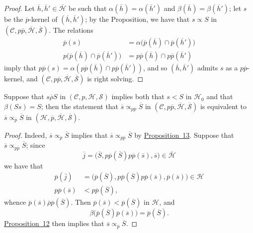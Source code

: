 \documentclass[a4paper,fleqn]{article}
\theoremstyle{plain}
\newenvironment{corollary}[1]
  {\renewcommand\theinnercorollary{#1}\innercorollary}
  {\endinnercorollary}
\theoremstyle{definition}
\newcommand{\oldpage}[1]{{\marginpar{\footnotesize$\bigg\vert$\,\,\,\,\textit{p.~#1}}}}
\newcommand{\CC}{\mathcal{C}}
\newcommand{\HH}{\mathcal{H}}
\newcommand{\bHH}{\overline{\HH}}
\renewcommand{\SS}{\mathcal{S}}
\newcommand{\bSS}{\overline{\SS}}
\newcommand{\relrhobar}{\mathrel{\overline{\rho}}}
\newcommand{\subs}{\mathrel{\propto}}
\begin{document}
\begin{proof}
  Let $\overline{h},\overline{h}'\in\bHH$ be such that $\alpha(\overline{h})=\alpha(\overline{h}')$ and $\beta(\overline{h})=\beta(\overline{h}')$;
  let $s$ be the $\overline{p}$-kernel of $(\overline{h},\overline{h}')$;
  by the Proposition, we have that $s\subs S$ in $(\CC,p\overline{p},\bHH,\bSS)$.
  The relations
  \[
    \begin{aligned}
      \overline{p}(s)
      &= \alpha\big(\overline{p}(\overline{h})\cap\overline{p}(\overline{h}')\big)
    \\p\big(\overline{p}(\overline{h})\cap\overline{p}(\overline{h}')\big)
      &= p\overline{p}(\overline{h})\cap p\overline{p}(\overline{h}')
    \end{aligned}
  \]
  imply that $p\overline{p}(s)=\alpha(p\overline{p}(\overline{h})\cap p\overline{p}(\overline{h}'))$, and so $(\overline{h},\overline{h}')$ admits $s$ as a $p\overline{p}$-kernel, and $(\CC,p\overline{p},\bHH,\bSS)$ is right solving.
\end{proof}

\begin{corollary}{4}
  Suppose that $s\relrhobar S$ in $(\CC,p,\HH,\SS)$ implies both that $s<S$ in $\HH_0$ and that $\beta(Ss)=S$;
  then the statement that $\overline{s}\subs_{p\overline{p}}\overline{S}$ in $(\CC,p\overline{p},\bHH,\bSS)$ is equivalent to $\overline{s}\subs_{\overline{p}}\overline{S}$ in $(\HH,\overline{p},\bHH,\bSS)$.
\end{corollary}

\oldpage{376}
\begin{proof}
  Indeed, $\overline{s}\subs_{\overline{p}}\overline{S}$ implies that $\overline{s}\subs_{p\overline{p}}\overline{S}$ by \hyperref[proposition:i-13]{Proposition~13}.
  Suppose that $\overline{s}\subs_{p\overline{p}}\overline{S}$;
  since
  \[
    \overline{j}
    = \big(
      \overline{S}, p\overline{p}(\overline{S})p\overline{p}(\overline{s}), \overline{s}
    \big)
    \in \bHH
  \]
  we have that
  \[
    \begin{aligned}
      \overline{p}(\overline{j})
      &= \big(
        \overline{p}(\overline{S}), p\overline{p}(\overline{S})p\overline{p}(\overline{s}), \overline{p}(\overline{s})
      \big)
      \in\HH
    \\p\overline{p}(\overline{s})
      &< p\overline{p}(\overline{S}),
    \end{aligned}
  \]
  whence $\overline{p}(\overline{s})\relrhobar\overline{p}(\overline{S})$.
  Then $\overline{p}(\overline{s})<\overline{p}(\overline{S})$ in $\HH$, and
  \[
    \beta\big(
      \overline{p}(\overline{S})\overline{p}(\overline{s})
    \big)
    = \overline{p}(\overline{S}).
  \]
  \hyperref[proposition:i-12]{Proposition~12} then implies that $\overline{s}\subs_{\overline{p}}\overline{S}$.
\end{proof}
\end{document}
